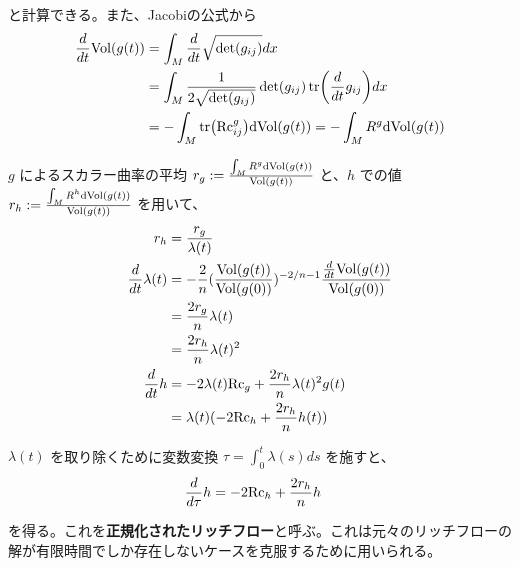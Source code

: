 \documentclass[dvipdfmx,a4paper]{jsreport}
\theoremstyle{definition}
\newcommand{\Vol}{{\rm Vol}}
\newcommand{\dVol}{{\rm dVol}}
\begin{document}
と計算できる。また、Jacobiの公式から
\begin{align*}
    {d \over dt}\Vol(g(t)) &= \int_M {d \over dt}\sqrt{\det(g_{ij})} dx \\
    &= \int_M {1 \over 2\sqrt{\det(g_{ij})}}\det(g_{ij})\tr({d \over dt}g_{ij}) dx \\
    &= -\int_M \tr(\mbox{Rc}^g_{ij}) \dVol(g(t)) = -\int_M R^g \dVol(g(t)) \\
\end{align*}

$g$ によるスカラー曲率の平均 $r_g:={\int_M R^g \dVol(g(t)) \over \Vol(g(t))}$ と、$h$ での値 $r_h:={\int_M R^h \dVol(g(t)) \over \Vol(g(t))}$ を用いて、
\begin{align*}
    r_h &= {r_g \over \lambda(t)} \\
    {d \over dt}\lambda(t) &= -{2 \over n}({\Vol(g(t)) \over \Vol(g(0))})^{-2/n-1}{{d \over dt} \Vol(g(t)) \over \Vol(g(0))} \\
    &= {2r_g \over n}\lambda(t) \\
    &= {2r_h \over n}\lambda(t)^2 \\
    {d \over dt}h &= -2\lambda(t)\mbox{Rc}_g+{2r_h \over n}\lambda(t)^2g(t) \\
    &= \lambda(t)(-2\mbox{Rc}_h+{2r_h \over n}h(t)) \\
\end{align*}

$\lambda(t)$ を取り除くために変数変換 $\tau=\int_{0}^t \lambda(s)ds$ を施すと、
\begin{align*}
    {d \over d\tau}h &= -2\mbox{Rc}_h+{2r_h \over n}h
\end{align*}

を得る。これを\textbf{正規化されたリッチフロー}と呼ぶ。これは元々のリッチフローの解が有限時間でしか存在しないケースを克服するために用いられる。
\end{document}
